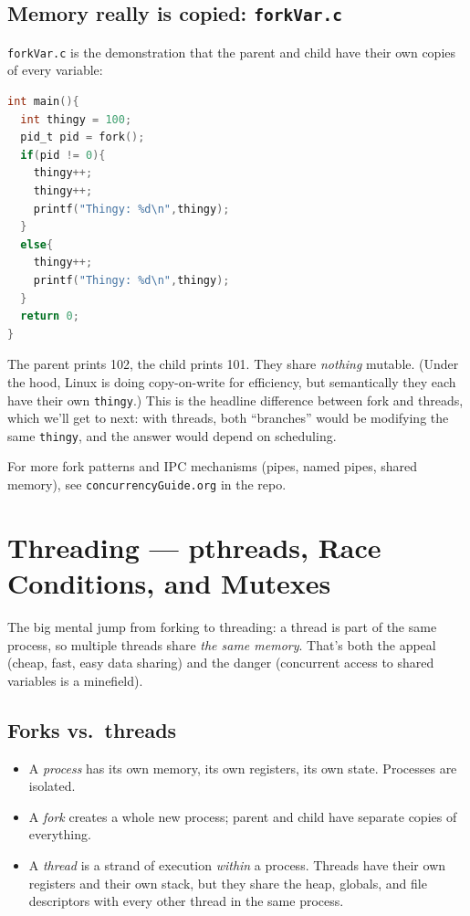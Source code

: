 \documentclass[11pt]{article}
\begin{document}
\subsection*{Memory really is copied: \texttt{forkVar.c}}

\texttt{forkVar.c} is the demonstration that the parent and child
have their own copies of every variable:

\begin{lstlisting}[language=C]
int main(){
  int thingy = 100;
  pid_t pid = fork();
  if(pid != 0){
    thingy++;
    thingy++;
    printf("Thingy: %d\n",thingy);
  }
  else{
    thingy++;
    printf("Thingy: %d\n",thingy);
  }
  return 0;
}
\end{lstlisting}

The parent prints 102, the child prints 101. They share \emph{nothing}
mutable. (Under the hood, Linux is doing copy-on-write for efficiency,
but semantically they each have their own \texttt{thingy}.) This is
the headline difference between fork and threads, which we'll get to
next: with threads, both ``branches'' would be modifying the same
\texttt{thingy}, and the answer would depend on scheduling.

For more fork patterns and IPC mechanisms (pipes, named pipes, shared
memory), see \texttt{concurrencyGuide.org} in the repo.

\section{Threading --- pthreads, Race Conditions, and Mutexes}

The big mental jump from forking to threading: a thread is part of
the same process, so multiple threads share \emph{the same memory}.
That's both the appeal (cheap, fast, easy data sharing) and the
danger (concurrent access to shared variables is a minefield).

\subsection*{Forks vs.\ threads}

\begin{itemize}
  \item A \emph{process} has its own memory, its own registers, its
    own state. Processes are isolated.
  \item A \emph{fork} creates a whole new process; parent and child
    have separate copies of everything.
  \item A \emph{thread} is a strand of execution \emph{within} a
    process. Threads have their own registers and their own stack,
    but they share the heap, globals, and file descriptors with every
    other thread in the same process.
\end{itemize}
\end{document}
